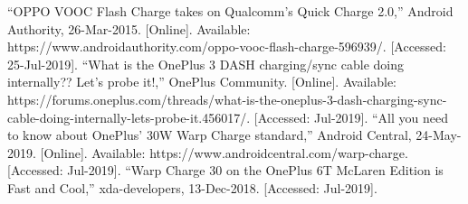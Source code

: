 \documentclass[conference]{IEEEtran}
\begin{document}
\begin{thebibliography}{00}
 “OPPO VOOC Flash Charge takes on Qualcomm’s Quick Charge 2.0,” Android Authority, 26-Mar-2015. [Online]. Available: https://www.androidauthority.com/oppo-vooc-flash-charge-596939/. [Accessed: 25-Jul-2019].
 “What is the OnePlus 3 DASH charging/sync cable doing internally?? Let’s probe it!,” OnePlus Community. [Online]. Available:
https://forums.oneplus.com/threads/what-is-the-oneplus-3-dash-charging-sync-cable-doing-internally-lets-probe-it.456017/. [Accessed: Jul-2019].
 “All you need to know about OnePlus’ 30W Warp Charge standard,” Android Central, 24-May-2019. [Online]. Available: https://www.androidcentral.com/warp-charge. [Accessed: Jul-2019].
 “Warp Charge 30 on the OnePlus 6T McLaren Edition is Fast and Cool,” xda-developers, 13-Dec-2018. [Accessed: Jul-2019].




\end{thebibliography}
\vspace{12pt}
\end{document}
